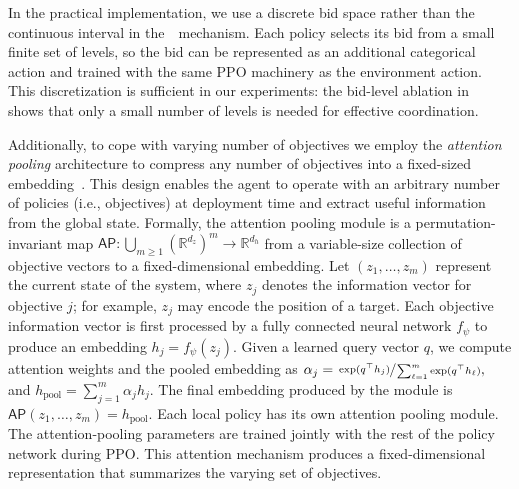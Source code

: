 In the practical implementation, we use a discrete bid space rather than the continuous interval in the~\allpay~mechanism.
Each policy selects its bid from a small finite set of levels, so the bid can be represented as an additional categorical action and trained with the same PPO machinery as the environment action.
This discretization is sufficient in our experiments: the bid-level ablation in~ shows that only a small number of levels is needed for effective coordination.

Additionally, to cope with varying number of objectives we employ the \textit{attention pooling} architecture to compress any number of objectives into a fixed-sized embedding~\citep{zaheer2017deep,lee2019set}. 
This design enables the agent to operate with an arbitrary number of policies (i.e., objectives) at deployment time and extract useful information from the global state. 
Formally, the attention pooling module is a permutation-invariant map $\textsf{AP}: \bigcup_{m \geq 1}(\mathbb{R}^{d_z})^m \to \mathbb{R}^{d_h}$ from a variable-size collection of objective vectors to a fixed-dimensional embedding.
Let $(z_1,\ldots,z_m)$ represent the current state of the system, where $z_j$ denotes the information vector for objective $j$; for example, $z_j$ may encode the position of a target.
Each objective information vector is first processed by a fully connected neural network $f_\psi$ to produce an embedding $h_j = f_\psi(z_j)$. 
Given a learned query vector $q$, we compute attention weights and the pooled embedding as 
$
\alpha_j
  =
  \sfrac{\exp(q^\top h_j)}
       {\sum_{\ell=1}^{m} \exp(q^\top h_\ell)},
$ and 
$
h_{\mathrm{pool}}
	  =
	  \sum_{j=1}^{m} \alpha_j h_j 
$.
%
The final embedding produced by the module is $\textsf{AP}(z_1,\ldots,z_m)=h_{\mathrm{pool}}$.
Each local policy has its own attention pooling module. 
The attention-pooling parameters are trained jointly with the rest of the policy network during PPO.
This attention mechanism produces a fixed-dimensional representation that summarizes the varying set of objectives.
